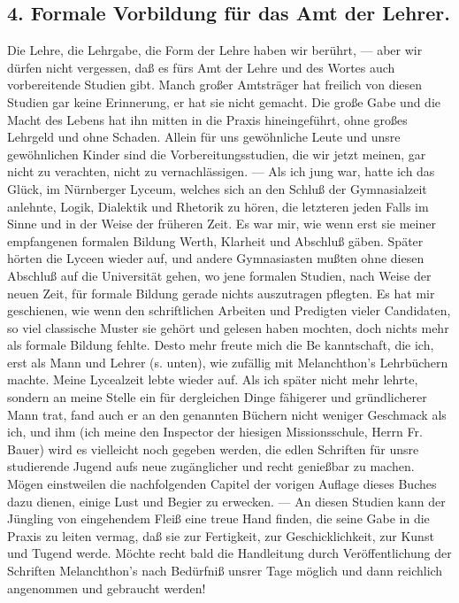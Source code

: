 \subsection*{4. Formale Vorbildung für das Amt der Lehrer.}

Die Lehre, die Lehrgabe, die Form der Lehre haben wir berührt, — aber wir dürfen nicht vergessen, daß es fürs Amt der Lehre und des Wortes auch vorbereitende Studien gibt. Manch großer Amtsträger hat freilich von diesen Studien gar keine Erinnerung, er hat sie nicht gemacht. Die große Gabe und die Macht des Lebens hat ihn mitten in die Praxis hineingeführt, ohne großes Lehrgeld und ohne Schaden. Allein für uns gewöhnliche Leute und unsre gewöhnlichen Kinder sind die Vorbereitungsstudien, die wir jetzt meinen, gar nicht zu verachten, nicht zu vernachlässigen. — Als ich jung war, hatte ich das Glück, im Nürnberger Lyceum, welches sich an den Schluß der Gymnasialzeit anlehnte, Logik, Dialektik und Rhetorik zu hören, die letzteren jeden Falls im Sinne und in der Weise der früheren Zeit. Es war mir, wie wenn erst sie meiner empfangenen formalen Bildung Werth, Klarheit und Abschluß gäben. Später hörten die Lyceen wieder auf, und andere Gymnasiasten mußten ohne diesen Abschluß auf die Universität gehen, wo jene formalen Studien, nach Weise der neuen Zeit, für formale Bildung gerade nichts auszutragen pflegten. Es hat mir geschienen, wie wenn den schriftlichen Arbeiten und Predigten vieler Candidaten, so viel classische Muster sie gehört und gelesen haben mochten, doch nichts mehr als formale Bildung fehlte. Desto mehr freute mich die Be%
kanntschaft, die ich, erst als Mann und Lehrer (s. unten), wie zufällig mit Melanchthon’s Lehrbüchern machte. Meine Lycealzeit lebte wieder auf. Als ich später nicht mehr lehrte, sondern an meine Stelle ein für dergleichen Dinge fähigerer und gründlicherer Mann trat, fand auch er an den genannten Büchern nicht weniger Geschmack als ich, und ihm (ich meine den Inspector der hiesigen Missionsschule, Herrn Fr. Bauer) wird es vielleicht noch gegeben werden, die edlen Schriften für unsre studierende Jugend aufs neue zugänglicher und recht genießbar zu machen. Mögen einstweilen die nachfolgenden Capitel der vorigen Auflage dieses Buches dazu dienen, einige Lust und Begier zu erwecken. — An diesen Studien kann der Jüngling von eingehendem Fleiß eine treue Hand finden, die seine Gabe in die Praxis zu leiten vermag, daß sie zur Fertigkeit, zur Geschicklichkeit, zur Kunst und Tugend werde. Möchte recht bald die Handleitung durch Veröffentlichung der Schriften Melanchthon’s nach Bedürfniß unsrer Tage möglich und dann reichlich angenommen und gebraucht werden!

